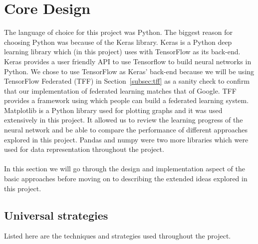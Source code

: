 \documentclass[12pt]{article}
\begin{document}
\section{Core Design}
The language of choice for this project was Python. The biggest reason for choosing Python was because of the Keras library. Keras is a Python deep learning library which (in this project) uses with TensorFlow as its back-end. Keras provides a user friendly API to use Tensorflow to build neural networks in Python. We chose to use TensorFlow as Keras' back-end because we will be using TensorFlow Federated (TFF) in Section~\ref{subsec:tff} as a  sanity check to confirm that our implementation of federated learning matches that of Google. TFF provides a framework using which people can build a federated learning system. Matplotlib is a Python library used for plotting graphs and it was used extensively in this project. It allowed us to review the learning progress of the neural network and be able to compare the performance of different approaches explored in this project. Pandas and numpy were two more libraries which were used for data representation throughout the project.
\\\\
In this section we will go through the design and implementation aspect of the basic approaches before moving on to describing the extended ideas explored in this project.
\subsection{Universal strategies}
Listed here are the techniques and strategies used throughout the project. 
\end{document}
